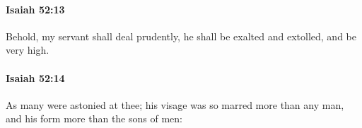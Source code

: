 		\paragraph{Isaiah 52:13} %
			\label{ISAIAH-52-13}

			Behold, my servant shall deal prudently, he shall be exalted and extolled, and be very high.


		\paragraph{Isaiah 52:14} %
			\label{ISAIAH-52-14}

			As many were astonied at thee; his visage was so marred more than any man, and his form more than the sons of men:


